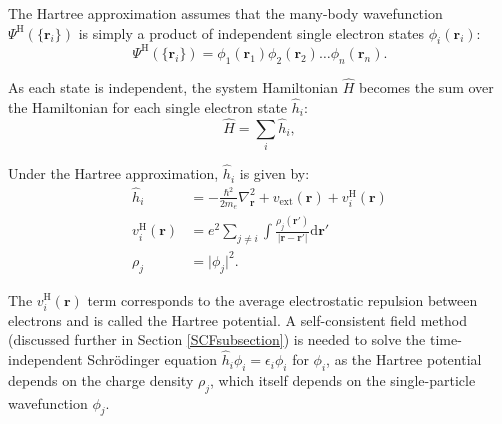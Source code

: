 The Hartree approximation assumes that the many-body wavefunction $\Psi^{\textrm{H}}(\{\textbf{r}_i\})$ is simply a product of independent single electron states $\phi_i(\textbf{r}_i)$:\autocite{Hartree1928}
\begin{equation}
\Psi^{\textrm{H}}(\{\textbf{r}_i\}) = \phi_1(\textbf{r}_1)\phi_2(\textbf{r}_2)\ldots\phi_n(\textbf{r}_n).
\end{equation}

As each state is independent, the system Hamiltonian $\hat{H}$ becomes the sum over the Hamiltonian for each single electron state $\hat{h}_i$:
\begin{equation}
\hat{H} = \sum_i\hat{h}_i,
\end{equation}

Under the Hartree approximation, $\hat{h}_i$ is given by:
\begin{align}
\hat{h}_i &= -\frac{\hbar^2}{2m_e}\nabla_{\textbf{r}}^2 + v_\mathrm{ext}(\textbf{r}) + v_i^\textrm{H}(\textbf{r}) \\
v_i^\textrm{H}(\textbf{r}) &= e^2\sum_{j\neq i} \int\frac{\rho_j(\textbf{r}')}{\lvert\textbf{r}-\textbf{r}'\rvert}\textrm{d}\textbf{r}' \\ \label{singleparticledensity}
\rho_j &= \lvert\phi_j\rvert^2.
\end{align}

The $v_i^\textrm{H}(\textbf{r})$ term corresponds to the average electrostatic repulsion between electrons and is called the Hartree potential. A self-consistent field method (discussed further in Section \ref{SCFsubsection}) is needed to solve the time-independent Schr\"{o}dinger equation $\hat{h}_i\phi_i=\epsilon_i\phi_i$ for $\phi_i$, as the Hartree potential depends on the charge density $\rho_j$, which itself depends on the single-particle wavefunction $\phi_j$. 


